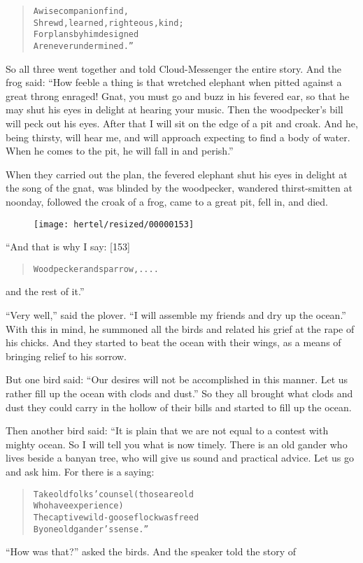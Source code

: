 \documentclass[article, twoside, 10pt]{memoir}
\renewenvironment{verbatim}{%
\begin{quote}%
\vskip -10pt%
\begin{alltt}\normalfont\small}{\end{alltt}%
\end{quote}%
\vskip -10pt
} %
\begin{document}
\begin{verbatim}
A wise companion find,
Shrewd, learned, righteous, kind;
For plans by him designed
Are never undermined.”
\end{verbatim}
So all three went together and told Cloud-Messenger the entire
story. And the frog said:
``How feeble a thing is that wretched elephant when pitted against a great throng enraged! Gnat, you must go and buzz in his fevered ear, so that he may shut his eyes in delight at hearing your music. Then the woodpecker's bill will peck out his eyes. After that I will sit on the edge of a pit and croak. And he, being thirsty, will hear me, and will approach expecting to find a body of water. When he comes to the pit, he will fall in and perish.''

When they carried out the plan, the fevered elephant shut his eyes
in delight at the song of the gnat, was blinded by the woodpecker,
wandered thirst-smitten at noonday, followed the croak of a frog,
came to a great pit, fell in, and died.

\begin{figure}[p]\texttt{[image: hertel/resized/00000153]}\end{figure}“And that is why I say: [153]

\begin{verbatim}
Woodpecker and sparrow, . . . .
\end{verbatim}
and the rest of it.”

``Very well,'' said the plover.
``I will assemble my friends and dry up the ocean.'' With this in
mind, he summoned all the birds and related his grief at the rape
of his chicks. And they started to beat the ocean with their wings,
as a means of bringing relief to his sorrow.

But one bird said:
``Our desires will not be accomplished in this manner. Let us rather fill up the ocean with clods and dust.''
So they all brought what clods and dust they could carry in the
hollow of their bills and started to fill up the ocean.

Then another bird said: “It is plain that we are not equal to a
contest with mighty ocean. So I will tell you what is now timely.
There is an old gander who lives beside a banyan tree, who will
give us sound and practical advice. Let us go and ask him. For
there is a saying:

\begin{verbatim}
Take old folks' counsel (those are old
    Who have experience)
The captive wild-goose flock was freed
    By one old gander's sense.”
\end{verbatim}
``How was that?'' asked the birds. And the speaker told the story
of
\end{document}

